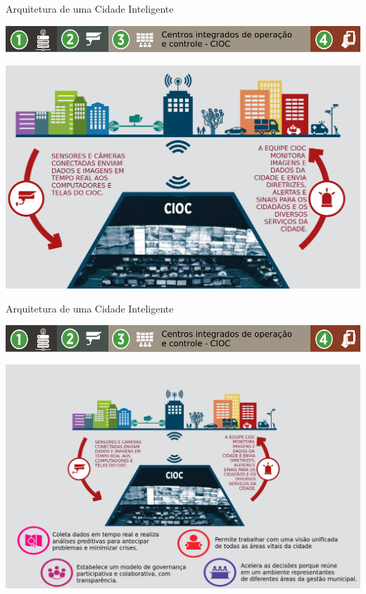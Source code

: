 \documentclass{beamer}
\begin{document}
\begin{frame}{Arquitetura de uma Cidade Inteligente}
\begin{center}
\includegraphics[width=1\textwidth]{img/arquitetura-menu-3.png}  
\end{center}
\begin{center}
\includegraphics[width=.8\textwidth]{img/cioc-1.png}  
\end{center}




\end{frame}






\begin{frame}{Arquitetura de uma Cidade Inteligente}
\begin{center}
\includegraphics[width=1\textwidth]{img/arquitetura-menu-3.png}  
\end{center}
\begin{center}
\includegraphics[width=.8\textwidth]{img/cioc-2.png}  
\end{center}




\end{frame}
\end{document}
